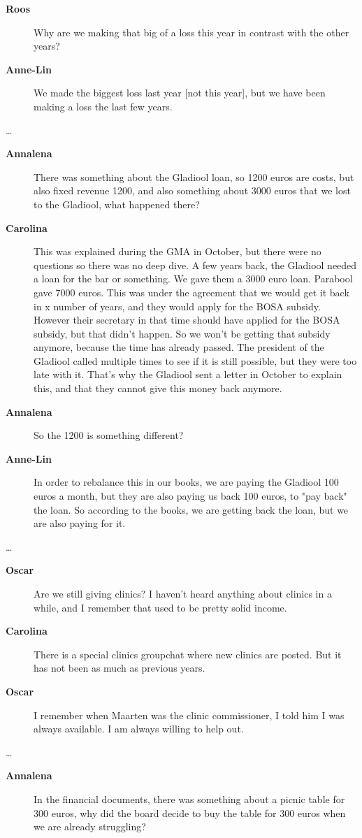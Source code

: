\documentclass[12pt, a4paper]{article}
\newcommand{\speak}[2]{\begin{description}\item[\textbf{#1}]#2\end{description}}
\begin{document}
\speak{Roos}{Why are we making that big of a loss this year in contrast with the other years?}

\speak{Anne-Lin}{We made the biggest loss last year [not this year], but we have been making a loss the last few years.}

\dots

\speak{Annalena}{There was something about the Gladiool loan, so 1200 euros are costs, but also fixed revenue 1200, and also something about 3000 euros that we lost to the Gladiool, what happened there?}

\speak{Carolina}{This was explained during the GMA in October, but there were no questions so there was no deep dive. A few years back, the Gladiool needed a loan for the bar or something. We gave them a 3000 euro loan. Parabool gave 7000 euros. This was under the agreement that we would get it back in x number of years, and they would apply for the BOSA subsidy. However their secretary in that time should have applied for the BOSA subsidy, but that didn't happen. So we won't be getting that subsidy anymore, because the time has already passed. The president of the Gladiool called multiple times to see if it is still possible, but they were too late with it. That's why the Gladiool sent a letter in October to explain this, and that they cannot give this money back anymore.}

\speak{Annalena}{So the 1200 is something different?}

\speak{Anne-Lin}{In order to rebalance this in our books, we are paying the Gladiool 100 euros a month, but they are also paying us back 100 euros, to "pay back" the loan. So according to the books, we are getting back the loan, but we are also paying for it.}

\dots

\speak{Oscar}{Are we still giving clinics? I haven't heard anything about clinics in a while, and I remember that used to be pretty solid income.}

\speak{Carolina}{There is a special clinics groupchat where new clinics are posted. But it has not been as much as previous years.}

\speak{Oscar}{I remember when Maarten was the clinic commissioner, I told him I was always available. I am always willing to help out.}

\dots

\speak{Annalena}{In the financial documents, there was something about a picnic table for 300 euros, why did the board decide to buy the table for 300 euros when we are already struggling?}
\end{document}
